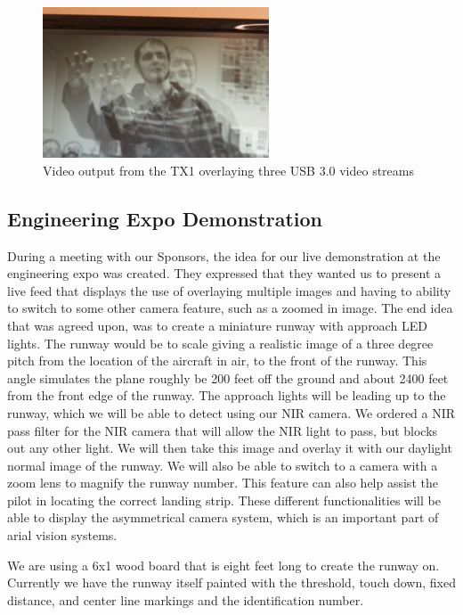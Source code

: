 \documentclass[letterpaper,10pt,titlepage]{IEEEtran}
\begin{document}
\begin{figure}[!ht]
  \caption{Video output from the TX1 overlaying three USB 3.0 video streams}
	  \centering
		    \includegraphics[width=0.6\textwidth]{images/3_normal.png}
				\end{figure}
				
  \subsection{Engineering Expo Demonstration}
  During a meeting with our Sponsors, the idea for our live demonstration at the engineering expo was created. They expressed that they wanted us to present a live feed that displays the use of overlaying multiple images and having to ability to switch to some other camera feature, such as a zoomed in image. The end idea that was agreed upon, was to create a miniature runway with approach LED lights. The runway would be to scale giving a realistic image of a three degree pitch from the location of the aircraft in air, to the front of the runway. This angle simulates the plane roughly be 200 feet off the ground and about 2400 feet from the front edge of the runway. The approach lights will be leading up to the runway, which we will be able to detect using our NIR camera. We ordered a NIR pass filter for the NIR camera that will allow the NIR light to pass, but blocks out any other light. We will then take this image and overlay it with our daylight normal image of the runway. We will also be able to switch to a camera with a zoom lens to magnify the runway number. This feature can also help assist the pilot in locating the correct landing strip. These different functionalities will be able to display the asymmetrical camera system, which is an important part of arial vision systems.\\
  \par
  We are using a 6x1 wood board that is eight feet long to create the runway on. Currently we have the runway itself painted with the threshold, touch down, fixed distance, and center line markings and the identification number.
   
\end{document}
